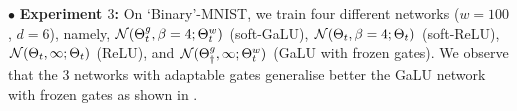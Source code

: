 $\bullet$ \textbf{Experiment $3$:} On `Binary'-MNIST, we train four different networks ($w=100$, $d=6$), namely, $\mathcal{N}({\Theta}^g_t,\beta=4;{\Theta}^w_t)$ (soft-GaLU), $\mathcal{N}(\Theta_t,\beta=4;\Theta_t)$ (soft-ReLU), $\mathcal{N}(\Theta_t,\infty;\Theta_t)$ (ReLU), and $\mathcal{N}({\Theta}^g_{\dagger}, \infty;{\Theta}^w_t)$ (GaLU with frozen gates). We observe that the $3$ networks with adaptable gates generalise better the GaLU network with frozen gates as shown in .

